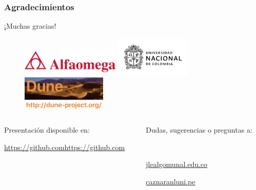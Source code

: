 \begin{frame}
	\frametitle{Agradecimientos}
	\begin{center}\LARGE
		¡Muchas gracias!
	\end{center}
	\begin{figure}[ht!]
		\centering
		\includegraphics[height=1.4cm]{alfaomega}\quad
		\includegraphics[height=1.9cm]{unal}\quad
		\includegraphics[height=1.6cm]{dune-logo}
	\end{figure}
	\vfill
	\begin{columns}
		\begin{column}{0.5\textwidth}
			\textcolor{c++reviewduneblue}{Presentación disponible en:}
			\begin{center}
				\href{https://github.com}{\url{https://github.comhttps://github.com}}
			\end{center}
		\end{column}
		\hfill
		\begin{column}{0.5\textwidth}
			\begin{flushright}
				Dudas, sugerencias o preguntas a:

				\

				\href{mailto:jlealgom@unal.edu.co}{jlealgom\MVAt unal.edu.co}

				\href{mailto:caznaranl@uni.pe}{caznaranl\MVAt uni.pe}
			\end{flushright}
		\end{column}
	\end{columns}

\end{frame}